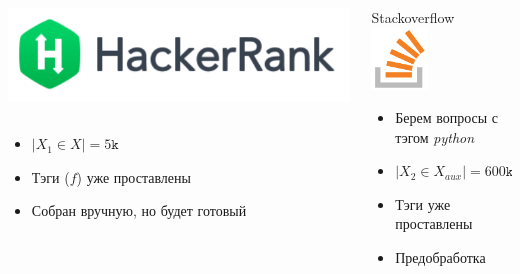 \documentclass[10pt]{beamer}
\begin{document}
\begin{frame}
\begin{columns}[T]
\begin{column}[T]{0.33\textwidth}
\begin{center}
\begin{columns}
\begin{column}{0.65\textwidth}
\begin{center}
                        \includegraphics[width=\textwidth]{images/hackerank.png}
                    \end{center}
                \end{column}
            \end{columns}
            \begin{itemize}
                \item $|X_1 \in X| = 5\texttt{k}$
                \item Тэги ($f$) уже проставлены
                \item Собран вручную, но будет готовый
            \end{itemize}
        \end{center}
    \end{column}
    \vline
    \begin{column}[T]{0.33\textwidth}
        \begin{center}
            Stackoverflow \\
            \includegraphics[width=0.4\textwidth]{images/stackoverflow.png} \\
            \begin{itemize}
                \item Берем вопросы с тэгом \textit{python}
                \item $|X_2 \in X_{aux}| = 600\texttt{k}$
                \item Тэги уже проставлены
                \item Предобработка
            \end{itemize}

\end{center}
\end{column}
\end{columns}
\end{frame}
\end{document}
